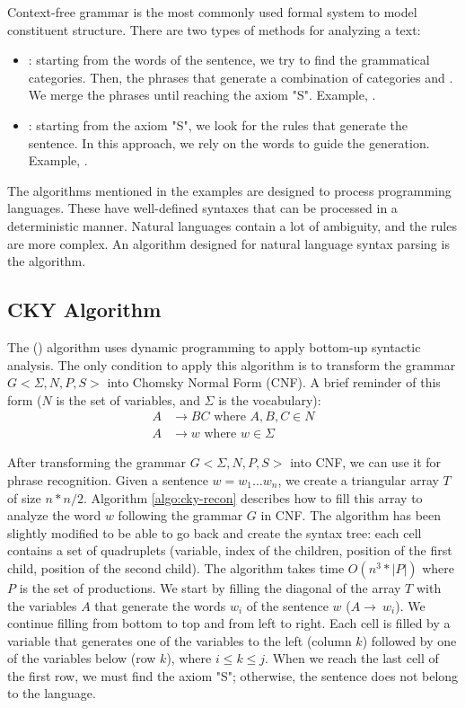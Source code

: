 \documentclass{KodeBook}
\begin{document}
Context-free grammar is the most commonly used formal system to model constituent structure.
There are two types of methods for analyzing a text:
\begin{itemize}
	\item {}: starting from the words of the sentence, we try to find the grammatical categories. Then, the phrases that generate a combination of categories and . We merge the phrases until reaching the axiom "S".
	Example, .
	\item {}: starting from the axiom "S", we look for the rules that generate the sentence. In this approach, we rely on the words to guide the generation.
	Example, .
\end{itemize}
The algorithms mentioned in the examples are designed to process programming languages. These have well-defined syntaxes that can be processed in a deterministic manner. Natural languages contain a lot of ambiguity, and the rules are more complex. An algorithm designed for natural language syntax parsing is the  algorithm.

\subsection{CKY Algorithm}

The  () algorithm uses dynamic programming to apply bottom-up syntactic analysis. The only condition to apply this algorithm is to transform the grammar $G <\Sigma, N, P, S>$ into Chomsky Normal Form (CNF). A brief reminder of this form ($N$ is the set of variables, and $\Sigma$ is the vocabulary):
\begin{align*}
	A & \rightarrow  B C \text{ where } A, B, C \in N\\
	A & \rightarrow w \text{ where } w \in \Sigma
\end{align*}

After transforming the grammar $G <\Sigma, N, P, S>$ into CNF, we can use it for phrase recognition. Given a sentence $w = w_1 \ldots w_n$, we create a triangular array $T$ of size $n*n/2$. Algorithm \ref{algo:cky-recon} describes how to fill this array to analyze the word $w$ following the grammar $G$ in CNF. The algorithm has been slightly modified to be able to go back and create the syntax tree: each cell contains a set of quadruplets (variable, index of the children, position of the first child, position of the second child). The algorithm takes time $O(n^3 * |P|)$ where $P$ is the set of productions. We start by filling the diagonal of the array $T$ with the variables $A$ that generate the words $w_i$ of the sentence $w$ ($A \rightarrow\ w_i$). We continue filling from bottom to top and from left to right. Each cell is filled by a variable that generates one of the variables to the left (column $k$) followed by one of the variables below (row $k$), where $i \le k \le j$. When we reach the last cell of the first row, we must find the axiom "S"; otherwise, the sentence does not belong to the language.
\end{document}
